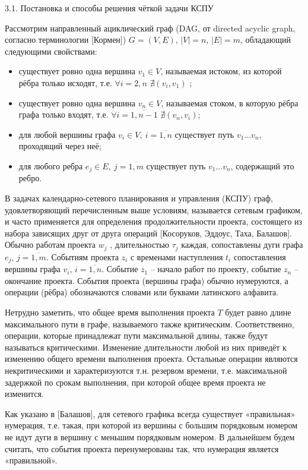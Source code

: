 3.1. Постановка и способы решения чёткой задачи КСПУ

Рассмотрим направленный ациклический граф (DAG, от directed acyclic graph, согласно терминологии [Кормен]) $G=(V,E)$, $\left| V \right|=n$, $\left| E \right|=m$, обладающий следующими свойствами:
\begin{itemize}
  \item существует ровно одна вершина ${{v}_{1}}\in V$, называемая истоком, из которой рёбра только исходят, т.е. $\forall i=2,n$ $\nexists \left( {{v}_{i}},{{v}_{1}} \right)$ ;
  \item существует ровно одна вершина ${{v}_{n}}\in V$, называемая стоком, в которую рёбра графа только входят, т.е.  $\forall i=\overline{1,n-1}$ $\nexists \left( {{v}_{n}},{{v}_{i}} \right)$;
  \item для любой вершины графа ${{v}_{i}}\in V,\ i=\overline{1,n}$ существует путь ${{v}_{1}}...{{v}_{n}}$, проходящий через неё;
  \item для любого ребра ${{e}_{j}}\in E,\ j=\overline{1,m}$ существует путь ${{v}_{1}}...{{v}_{n}}$, содержащий это ребро.
\end{itemize}

В задачах календарно-сетевого планирования и управления (КСПУ) граф, удовлетворяющий перечисленным выше условиям, называется сетевым графиком, и часто применяется для определения продолжительности проекта, состоящего из набора зависящих друг от друга операций [Косоруков, Эддоус, Таха, Балашов]. Обычно работам проекта ${{w}_{j}}$ , длительностью $\tau_j$ каждая, сопоставлены дуги графа ${{e}_{j}}$, $j=\overline{1,m}$. Событиям проекта ${{z}_{i}}$ с временами наступления ${{t}_{i}}$ сопоставления вершины графа ${{v}_{i}}$, $i=\overline{1,n}$. Событие ${{z}_{1}}$ – начало работ по проекту, событие ${{z}_{n}}$ – окончание проекта. События проекта (вершины графа) обычно нумеруются, а операции (рёбра) обозначаются словами или буквами латинского алфавита.

Нетрудно заметить, что общее время выполнения проекта $T$ будет равно длине максимального пути в графе, называемого также критическим. Соответственно, операции, которые принадлежат пути максимальной длины, также будут называться критическими. Изменение длительности любой из них приведёт к изменению общего времени выполнения проекта. Остальные операции являются некритическими и характеризуются т.н. резервом времени, т.е. максимальной задержкой по срокам выполнения, при которой общее время проекта не изменится.

Как указано в [Балашов], для сетевого графика всегда существует «правильная» нумерация, т.е. такая, при которой из вершины с большим порядковым номером не идут дуги в вершину с меньшим порядковым номером. В дальнейшем будем считать, что события проекта перенумерованы так, что нумерация является «правильной».

